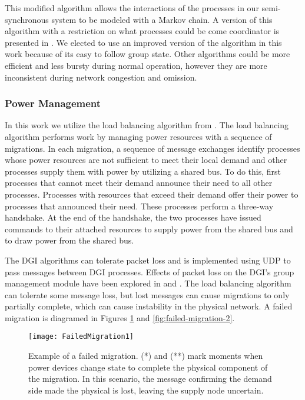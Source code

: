 This modified algorithm allows the interactions of the processes in our semi-synchronous system to be modeled with a Markov chain.
A version of this algorithm with a restriction on what processes could be come coordinator is presented in \cite{JOURNAL}.
We elected to use an improved version of the algorithm in this work because of its easy to follow group state.
Other algorithms could be more efficient and less bursty during normal operation, however they are more inconsistent during network congestion and omission.

\subsubsection{Power Management}

In this work we utilize the load balancing algorithm from \cite{LOADBALANCING}.
The load balancing algorithm performs work by managing power resources with a sequence of migrations\cite{HILTESTBED}.
In each migration, a sequence of message exchanges identify processes whose power resources are not sufficient to meet their local demand and other processes supply them with power by utilizing a shared bus.
To do this, first processes that cannot meet their demand announce their need to all other processes.
Processes with resources that exceed their demand offer their power to processes that announced their need.
These processes perform a three-way handshake.
At the end of the handshake, the two processes have issued commands to their attached resources to supply power from the shared bus and to draw power from the shared bus.

The \ac{DGI} algorithms can tolerate packet loss and is implemented using UDP to pass messages between \ac{DGI} processes.
Effects of packet loss on the \ac{DGI}'s group management module have been explored in \cite{CRITIS2012} and \cite{JOURNAL}.
The load balancing algorithm can tolerate some message loss, but lost messages can cause migrations to only partially complete, which can cause instability in the physical network.
A failed migration is diagramed in Figures \ref{fig:failed-migration-1} and \ref{fig:failed-migration-2}.

\begin{figure}
\texttt{[image: FailedMigration1]}
\caption{Example of a failed migration. (*) and (**) mark moments when power devices change state to complete the physical component of the migration. In this scenario, the message confirming the demand side made the physical is lost, leaving the supply node uncertain.}
\label{fig:failed-migration-1}
\end{figure}

